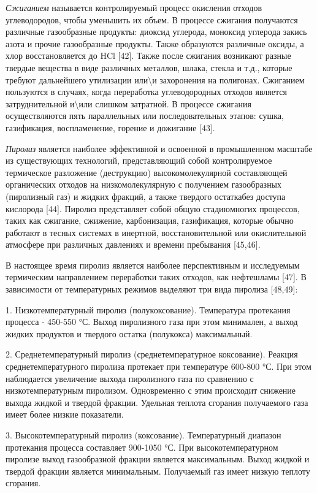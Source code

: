 \begin{multicols}{2}
\emph{Сжиганием} называется контролируемый процесс окисления отходов
углеводородов, чтобы уменьшить их объем. В процессе сжигания получаются
различные газо­образные продукты: диоксид углерода, моноксид углеро­да
закись азота и прочие газообразные продукты. Также образуются различные
оксиды, а хлор восстановляется до HCl {[}42{]}. Также после сжигания
возникают разные твердые вещества в виде различных металлов, шлака,
стекла и т.д., которые требуют дальнейшего утилизации
или\textbackslash и захо­ронения на полигонах. Сжиганием пользуются в
случаях, когда переработка углеводородных отходов является
затруднительной и\textbackslash или слишком затратной. В процессе
сжигания осуществляются пять парал­лельных или последовательных этапов:
сушка, газифи­кация, воспламенение, горение и дожигание {[}43{]}.

\emph{Пиролиз} является наиболее эффективной и освоенной в промышленном
масштабе из существующих технологий, представляющий собой контролируемое
термическое разло­жение (деструкцию) высокомолекулярной составляющей
органических отходов на низкомолекулярную с получе­нием газообразных
(пиролизный газ) и жидких фракций, а также твердого остаткабез доступа
кислорода {[}44{]}. Пиролиз представляет собой общую стадиюмногих
процессов, таких как сжигание, сжижение, карбонизация, газификация,
которые обычно работают в тесных системах в инертной, восстановительной
или окислительной атмосфере при различных давлениях и времени пребывания
{[}45,46{]}.

В настоящее время пиролиз является наиболее перспективным и исследуемым
термическим направлением переработки таких отходов, как нефтешламы
{[}47{]}. В зависимости от температурных режимов выделяют три вида
пиролиза {[}48,49{]}:

1. Низкотемпературный пиролиз (полукоксование). Температура протекания
процесса - 450-550 °С. Выход пиролизного газа при этом минимален, а
выход жидких продуктов и твердого остатка (полукокса) максимальный.

2. Среднетемпературный пиролиз (среднетемпе­ратурное коксование). Реакция
среднетемпературного пиролиза протекает при температуре 600-800 °С. При
этом наблюдается увеличение выхода пиролизного газа по сравнению с
низкотемпературным пиролизом. Одновременно с этим происходит снижение
выхода жид­кой и твердой фракции. Удельная теплота сгорания получаемого
газа имеет более низкие показатели.

3. Высокотемпературный пиролиз (коксование). Температурный диапазон
протекания процесса состав­ляет 900-1050 °С. При высокотемпературном
пиролизе выход газообразной фракции является максимальным. Выход жидкой
и твердой фракции является минималь­ным. Получаемый газ имеет низкую
теплоту сгорания.


\end{multicols}
